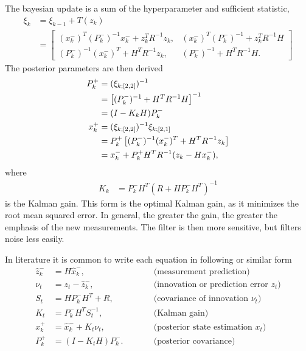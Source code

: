The bayesian update is a sum of the hyperparameter and sufficient statistic,
\begin{align}
    \xi_{k}
    &= \xi_{k-1} +  T(z_{k})  \nonumber \\
    &=
    \begin{bmatrix}
    (x_{k}^{-})^{T} (P_{k}^{-})^{-1} x_{k}^{-} + z_{k}^{T} R^{-1} z_{k},
    & (x_{k}^{-})^{T} (P_{k}^{-})^{-1} + z_{k}^{T} R^{-1} H \\
    (P_{k}^{-})^{-1} (x_{k}^{-})^{T} + H^{T} R^{-1} z_{k},
    & (P_{k}^{-})^{-1} + H^{T} R^{-1} H.
    \end{bmatrix}
\end{align}
The posterior parameters are then derived
\begin{align}
    P_{k}^{+} &= (\xi_{k;[2,2]})^{-1} \notag\\
    &= \left[ (P_{k}^{-})^{-1} + H^{T} R^{-1} H \right]^{-1} \notag\\
    &= (I - K_{k} H) P_{k}^{-} \\
    x_{k}^{+} &= (\xi_{k;[2,2]})^{-1} \xi_{k;[2,1]} \notag\\
    &= P_{k}^{+} \left[ (P_{k}^{-})^{-1} (x_{k}^{-})^{T} + H^{T} R^{-1} z_{k}\right] \notag \\
    &= x_{k}^{-} + P_{k}^{+} H^{T} R^{-1}(z_{k} - Hx_{k}^{-}),
\end{align}
where
\begin{align}
    K_{k} &= P_{k}^{-} H^{T}(R + H P_{k}^{-}H^{T})^{-1} \label{eq:kalman_gain}
\end{align}
is the Kalman gain. This form is the optimal Kalman gain, as it minimizes the root mean squared error. In general, the
greater the gain, the greater the emphasis of the new measurements. The filter is then more sensitive, but filters noise less easily.

In literature it is common to write each equation in following or similar form
\begin{align}
    \hat{z}_{k}^{-} &= H \hat{x}_{k}^{-}, \qquad &&\text{(measurement prediction)} \\
    \nu_t &= z_t - \hat{z}_{k}^{-}, \qquad &&\text{(innovation or prediction error $z_t$)} \\
    S_t &= H P_{k}^{-} H^T + R, \qquad &&\text{(covariance of innovation $\nu_t$)} \\
    K_t &= P_{k}^{-} H^T S_t^{-1}, \qquad &&\text{(Kalman gain)} \\
    {x}_{k}^{+} &= \hat{x}_{k}^{-} + K_t \nu_t, \qquad &&\text{(posterior state estimation $x_t$)} \\
    P_{k}^{+} &= (I - K_t H) P_{k}^{-}. \qquad &&\text{(posterior covariance)}
\end{align}

